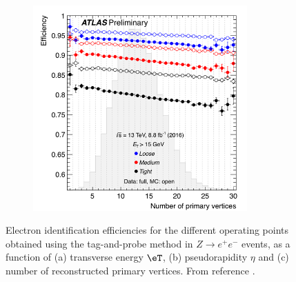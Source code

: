 \begin{figure}[h!]
\begin{subfigure}{0.5\textwidth}
  \label{sec:obj:fig:eleeffeta}
\end{subfigure}
\begin{center}
\begin{subfigure}{0.5\textwidth}
  \centering
  \includegraphics[width=0.9\textwidth]{figures/Objects/eleeffnpv.png}
  \caption{}
  \label{sec:obj:fig:eleeffnpv}
\end{subfigure}
\end{center}
\captionsetup{width=0.85\textwidth}  \caption{\small Electron identification efficiencies for the different operating points obtained using the tag-and-probe method in $Z \to e^+e^-$ events, as a function of (a) transverse energy $\eT$, (b) pseudorapidity $\eta$ and (c) number of reconstructed primary vertices. From reference \cite{ATLAS-CONF-2016-024}.}
\label{sec:obj:fig:eleeff}
\end{figure}

